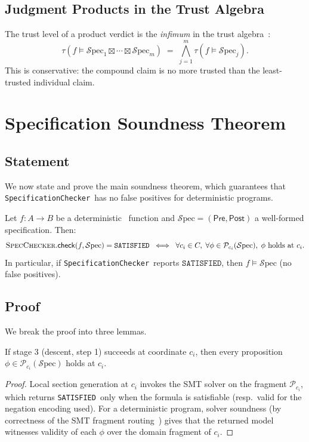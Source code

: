 \documentclass[11pt]{article}
\newcommand{\Spec}{\mathcal{S}\mathrm{pec}}        %
\newcommand{\Pre}{\ensuremath{\mathsf{Pre}}}                     %
\newcommand{\Post}{\ensuremath{\mathsf{Post}}}                   %
\newcommand{\SpecCh}{\textsc{SpecChecker}}          %
\newcommand{\Props}{\mathcal{P}}                    %
\newcommand{\CoordProps}[1]{\Props_{#1}}            %
\newcommand{\SAT}{\texttt{SATISFIED}}               %
\newcommand{\JudProd}{\boxtimes}                    %
\newcommand{\SpecificationChecker}{\texttt{SpecificationChecker}}
\begin{document}
\subsection{Judgment Products in the Trust Algebra}\label{sec:trust-product}

The trust level of a product verdict is the \emph{infimum} in the
trust algebra~\cite{JuGeo04}:
\[
  \tau(f \models \Spec_1 \JudProd \cdots \JudProd \Spec_m)
  \;=\;
  \bigwedge_{j=1}^m \tau(f \models \Spec_j).
\]
This is conservative: the compound claim is no more trusted than the
least-trusted individual claim.

\section{Specification Soundness Theorem}\label{sec:soundness}

\subsection{Statement}\label{sec:soundness-statement}

We now state and prove the main soundness theorem, which guarantees
that \SpecificationChecker\ has no false positives for deterministic
programs.

\begin{theorem}\label{thm:soundness}
Let $f : A \to B$ be a deterministic \Python\ function and
$\Spec = (\Pre, \Post)$ a well-formed specification.  Then:
\[
  \SpecCh.\mathsf{check}(f, \Spec) = \SAT
  \;\iff\;
  \forall c_i \in C,\;
  \forall \phi \in \CoordProps{c_i}(\Spec),\;
  \phi \text{ holds at } c_i.
\]
In particular, if \SpecificationChecker\ reports $\SAT$, then
$f \models \Spec$ (no false positives).
\end{theorem}

\subsection{Proof}\label{sec:soundness-proof}

We break the proof into three lemmas.

\begin{lemma}\label{lem:local-correct}
If stage 3 (descent, step 1) succeeds at coordinate $c_i$, then
every proposition $\phi \in \CoordProps{c_i}(\Spec)$ holds at $c_i$.
\end{lemma}
\begin{proof}
Local section generation at $c_i$ invokes the SMT solver on the
fragment $\CoordProps{c_i}$, which returns \SAT\ only when the
formula is satisfiable (resp.\ valid for the negation encoding used).
For a deterministic program, solver soundness (by correctness of the
SMT fragment routing~\cite{JuGeo05}) gives that the returned model
witnesses validity of each $\phi$ over the domain fragment of $c_i$.
\end{proof}
\end{document}
